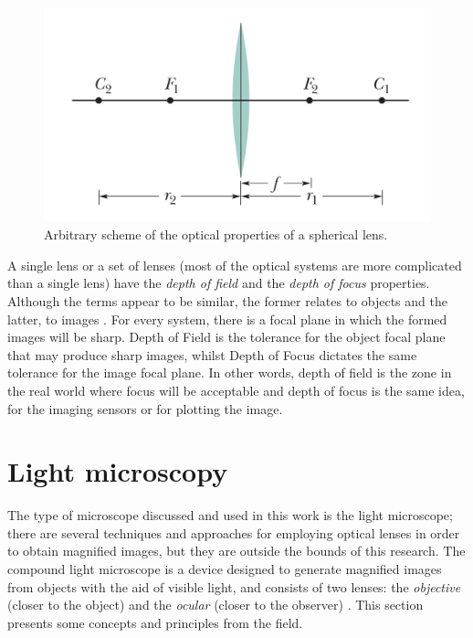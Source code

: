 \begin{figure}[htb]
	\centering
	\caption{\label{fig:spherical_lens}Arbitrary scheme of the optical properties of a spherical lens.}
	\begin{center}
	    \includegraphics[scale=0.4]{images/fig4.png}
	\end{center}
	\centering
\end{figure}

A single lens or a set of lenses (most of the optical systems are more complicated than a single lens) have the \emph{depth of field} and the \emph{depth of focus} properties. Although the terms appear to be similar, the former relates to objects and the latter, to images \cite{davidson2002optical}. For every system, there is a focal plane in which the formed images will be sharp. Depth of Field is the tolerance for the object focal plane that may produce sharp images, whilst Depth of Focus dictates the same tolerance for the image focal plane. In other words, depth of field is the zone in the real world where focus will be acceptable and depth of focus is the same idea, for the imaging sensors or for plotting the image.





\section{Light microscopy}
\label{sec:light_microscopy}

The type of microscope discussed and used in this work is the light microscope; there are several techniques and approaches for employing optical lenses in order to obtain magnified images, but they are outside the bounds of this research. The compound light microscope is a device designed to generate magnified images from objects with the aid of visible light, and consists of two lenses: the \emph{objective} (closer to the object) and the \emph{ocular} (closer to the observer) \cite{murphy2012fundamentals}. This section presents some concepts and principles from the field.

